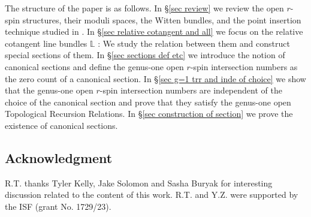 \documentclass[11pt]{amsart}
\theoremstyle{definition}
\theoremstyle{remark}
\newcommand{\<}{\left<}
\renewcommand{\>}{\right>}
\numberwithin{equation}{section}
\begin{document}
The structure of the paper is as follows. In \S\ref{sec review} we review the open $r$-spin structures, their moduli spaces, the Witten bundles, and the point insertion technique studied in \cite{BCT1,TZ1}. %
In \S \ref{sec relative  cotangent and all} we %
focus on the relative cotangent line bundles $\mathbb L$%
: We study %
the relation between them and construct special sections of them. In \S \ref{sec sections def etc} we introduce the notion of canonical sections and define the genus-one open $r$-spin intersection numbers as the zero count of a canonical section. In \S \ref{sec g=1 trr  and inde of choice} we show that the genus-one open $r$-spin intersection numbers are independent of the choice of the %
canonical section and %
prove that they satisfy the genus-one %
open Topological Recursion Relations. In %
\S\ref{sec construction of section} we prove the existence of canonical %
sections.


\subsection{Acknowledgment}
R.T. thanks Tyler Kelly, Jake Solomon and Sasha Buryak for interesting discussion related to the content of this work. R.T. and Y.Z. were supported by the ISF (grant No. 1729/23).
\end{document}
